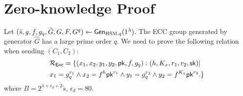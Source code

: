 \documentclass[runningheads]{llncs}
\newcommand{\sk}{{\sf sk}}
\newcommand{\pk}{{\sf pk}}
\begin{document}
	\section{Zero-knowledge Proof}
Let	$(\tilde{s}, g, f, g_q, \tilde{G}, G, F, G^q) \gets {\sf Gen}_{{\rm HSM}, q}(1^\lambda)$. The ECC group generated by generator $\hat{G}$ has a large prime order $q$.
We need to prove the following relation when sending $(C_1,C_2)$:
\begin{align*}	
&\mathcal{R}_{\sf Enc} = \{ (x_1,x_2,y_1,y_2,\pk,f,g_q) : (h, K_x, r_1, r_2, \sk) |   \\
&x_1 = g_q^{r_1} \wedge x_2 = f^h \pk^ {r_1} \wedge y_1= g_q^{r_2} \wedge y_2= f^{K_x} \pk^ {r_2}.\}
\end{align*}
where $B = 2^{\lambda+\epsilon_d+2}  \tilde{s}$, $\epsilon_d = 80$.
\end{document}
